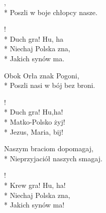 \begin{lyrics}[longestline={W krwawym polu srebrne ptaszę,}]

,\\*
Poszli w boje chłopcy nasze.

\begin{chorus}
!\\*
Duch gra! Hu, ha\\*
Niechaj Polska zna,\\*
Jakich synów ma.
\end{chorus}

Obok Orła znak Pogoni,\\*
Poszli nasi w bój bez broni.

\begin{chorus}
!\\*
Duch gra! Hu,ha!\\*
Matko-Polsko żyj!\\*
Jezus, Maria, bij!
\end{chorus}

Naszym braciom dopomagaj,\\*
Nieprzyjaciół naszych smagaj.

\begin{chorus}
!\\*
Krew gra! Hu, ha!\\*
Niechaj Polska zna,\\*
Jakich synów ma!
\end{chorus}
\end{lyrics}




